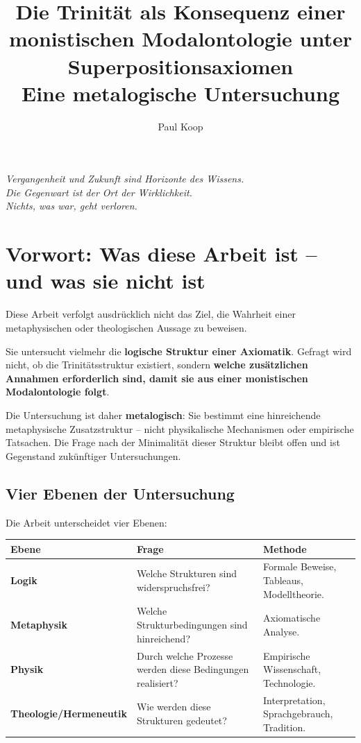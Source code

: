 \documentclass[
]{article}
\title{Die Trinität als Konsequenz einer monistischen Modalontologie unter Superpositionsaxiomen \\ \large Eine metalogische Untersuchung}
\author{Paul Koop}
\date{}
\begin{document}
\maketitle

\begin{center}
\emph{Vergangenheit und Zukunft sind Horizonte des Wissens. \\ Die Gegenwart ist der Ort der Wirklichkeit. \\ Nichts, was war, geht verloren.}
\end{center}

\newpage
{
\setcounter{tocdepth}{3}
\tableofcontents
}
\newpage

\section{Vorwort: Was diese Arbeit ist – und was sie nicht ist}

Diese Arbeit verfolgt ausdrücklich nicht das Ziel, die Wahrheit einer metaphysischen oder theologischen Aussage zu beweisen.

Sie untersucht vielmehr die \textbf{logische Struktur einer Axiomatik}. Gefragt wird nicht, ob die Trinitätsstruktur existiert, sondern \textbf{welche zusätzlichen Annahmen erforderlich sind, damit sie aus einer monistischen Modalontologie folgt}.

Die Untersuchung ist daher \textbf{metalogisch}: Sie bestimmt eine hinreichende metaphysische Zusatzstruktur – nicht physikalische Mechanismen oder empirische Tatsachen. Die Frage nach der Minimalität dieser Struktur bleibt offen und ist Gegenstand zukünftiger Untersuchungen.

\subsection{Vier Ebenen der Untersuchung}

Die Arbeit unterscheidet vier Ebenen:

\begin{table}[h]
\centering
\begin{tabular}{lll}
\toprule
\textbf{Ebene} & \textbf{Frage} & \textbf{Methode} \\
\midrule
\textbf{Logik} & Welche Strukturen sind widerspruchsfrei? & Formale Beweise, Tableaus, Modelltheorie. \\
\textbf{Metaphysik} & Welche Strukturbedingungen sind hinreichend? & Axiomatische Analyse. \\
\textbf{Physik} & Durch welche Prozesse werden diese Bedingungen realisiert? & Empirische Wissenschaft, Technologie. \\
\textbf{Theologie/Hermeneutik} & Wie werden diese Strukturen gedeutet? & Interpretation, Sprachgebrauch, Tradition. \\
\bottomrule
\end{tabular}
\end{table}
\end{document}
